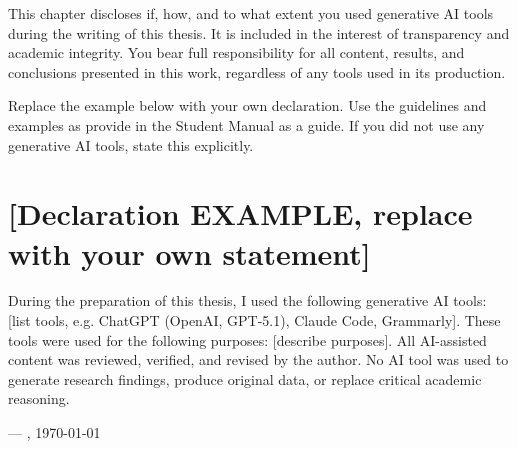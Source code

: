 This chapter discloses if, how, and to what extent you used generative AI tools during the writing of this thesis.
It is included in the interest of transparency and academic integrity.
You bear full responsibility for all content, results, and conclusions presented in this work, regardless of any tools used in its production.

Replace the example below with your own declaration.
Use the guidelines and examples as provide in the Student Manual as a guide.
If you did not use any generative AI tools, state this explicitly.

\section{[Declaration EXAMPLE, replace with your own statement]}

During the preparation of this thesis, I used the following generative AI tools: [list tools, e.g. ChatGPT (OpenAI, GPT-5.1), Claude Code, Grammarly].
These tools were used for the following purposes: [describe purposes].
All AI-assisted content was reviewed, verified, and revised by the author.
No AI tool was used to generate research findings, produce original data, or replace critical academic reasoning.
\begin{flushright}
	--- \theauthor{}, \today
\end{flushright}
